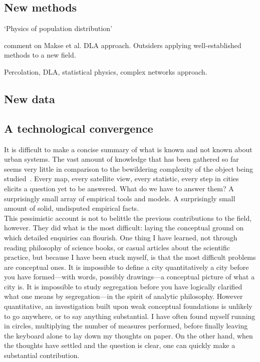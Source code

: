     \subsection{New methods}
    \label{sub:new_methods}

\cite{Stewart:1959} `Physics of population distribution'

\cite{Batty:1995} comment on Makse et al. DLA approach.
Outsiders applying well-established methods to a new field.

Percolation, DLA, statistical physics, complex networks approach.

    \subsection{New data}
    \label{sub:new_data}
    
    \subsection{A technological convergence}
    \label{sub:a_technological_convergence} 

It is difficult to make a concise summary of what is known and not known about
urban systems. The vast amount of knowledge that has been gathered so far seems
very little in comparison to the bewildering complexity of the object being
studied~\cite{Batty:2008}. Every map, every satellite view, every statistic, every step
in cities elicits a question yet to be answered. What do we have to answer them?
A surprisingly small array of empirical tools and models. A surprisingly small
amount of solid, undisputed empirical facts.\\

This pessimistic account is not to belittle the previous contributions to the
field, however. They did what is the most difficult: laying the conceptual
ground on which detailed enquiries can flourish. One thing I have learned, not
through reading philosophy of science books, or casual articles about the
scientific practice, but because I have been stuck myself, is that the most
difficult problems are conceptual ones. It is impossible to define a city
quantitatively a city before you have formed---with words, possibly drawings---a
conceptual picture of what a city is. It is impossible to study segregation
before you have logically clarified what one means by segregation---in the
spirit of analytic philosophy. However quantitative, an investigation built upon
weak conceptual foundations is unlikely to go anywhere, or to say anything
substantial. I have often found myself running in circles, multiplying the
number of measures performed, before finally leaving the keyboard alone to lay
down my thoughts on paper. On the other hand, when the thoughts have settled and
the question is clear, one can quickly make a substantial contribution.\\

